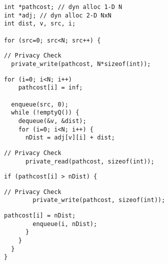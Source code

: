 \begin{lstlisting}[morekeywords={pathcost}, belowskip=0pt, firstnumber=1,
name=dij_checks]
int *pathcost; // dyn alloc 1-D N
int *adj; // dyn alloc 2-D NxN
int dist, v, src, i;

for (src=0; src<N; src++) {
\end{lstlisting}

\begin{lstlisting}[morekeywords={pathcost}, aboveskip=0pt,belowskip=0pt,backgroundcolor=\color{lightgray},
firstnumber=auto, name=dij_checks]
  // Privacy Check
  private_write(pathcost, N*sizeof(int));
\end{lstlisting}

\begin{lstlisting}[morekeywords={pathcost},aboveskip=0pt, belowskip=0pt, firstnumber=auto,name=dij_checks]
  for (i=0; i<N; i++)
    pathcost[i] = inf;

  enqueue(src, 0);
  while (!emptyQ()) {
    dequeue(&v, &dist);
    for (i=0; i<N; i++) {
      nDist = adj[v][i] + dist;
\end{lstlisting}

\begin{lstlisting}[morekeywords={pathcost}, aboveskip=0pt,belowskip=0pt,backgroundcolor=\color{lightgray},
firstnumber=auto, name=dij_checks]
      // Privacy Check
      private_read(pathcost, sizeof(int));
\end{lstlisting}


\begin{lstlisting}[morekeywords={pathcost}, aboveskip=0pt, belowskip=0pt, firstnumber=auto,name=dij_checks]
      if (pathcost[i] > nDist) {
\end{lstlisting}

\begin{lstlisting}[morekeywords={pathcost}, aboveskip=0pt,belowskip=0pt,backgroundcolor=\color{lightgray},
firstnumber=auto, name=dij_checks]
        // Privacy Check
        private_write(pathcost, sizeof(int));
\end{lstlisting}

\begin{lstlisting}[morekeywords={pathcost}, aboveskip=0pt, belowskip=0pt, firstnumber=auto,name=dij_checks]
        pathcost[i] = nDist;
        enqueue(i, nDist);
      }
    }
  }
}
\end{lstlisting}
